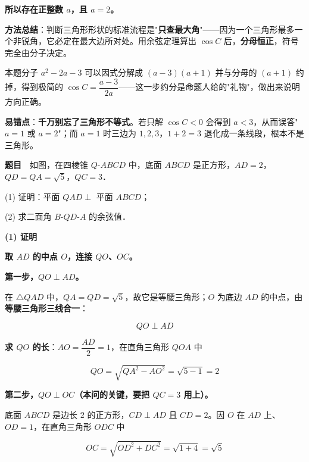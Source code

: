 \textbf{所以存在正整数 $a$，且 $a=2$。}


\begin{gktip}
\textbf{方法总结}：判断三角形形状的标准流程是"\textbf{只查最大角}"——因为一个三角形最多一个非锐角，它必定在最大边所对处。用余弦定理算出 $\cos C$ 后，\textbf{分母恒正}，符号完全由分子决定。

本题分子 $a^{2}-2a-3$ 可以因式分解成 $(a-3)(a+1)$ 并与分母的 $(a+1)$ 约掉，得到极简的 $\cos C=\dfrac{a-3}{2a}$——这一步约分是命题人给的"礼物"，做出来说明方向正确。

\textbf{易错点}：\textbf{千万别忘了三角形不等式}。若只解 $\cos C<0$ 会得到 $a<3$，从而误答"$a=1$ 或 $a=2$"；而 $a=1$ 时三边为 $1,2,3$，$1+2=3$ 退化成一条线段，根本不是三角形。
\end{gktip}

\par\medskip


\textbf{题目}　如图，在四棱锥 $Q\text{-}ABCD$ 中，底面 $ABCD$ 是正方形，$AD=2$，$QD=QA=\sqrt5$，$QC=3$．

\begin{center}\end{center}

  (1) 证明：平面 $QAD\perp$ 平面 $ABCD$；

  (2) 求二面角 $B\text{-}QD\text{-}A$ 的余弦值．

\par\medskip

\textbf{(1) 证明}

\textbf{取 $AD$ 的中点 $O$，连接 $QO$、$OC$。}

\textbf{第一步，$QO\perp AD$。}

在 $\triangle QAD$ 中，$QA=QD=\sqrt5$，故它是等腰三角形；$O$ 为底边 $AD$ 的中点，由\textbf{等腰三角形三线合一}：

\[QO\perp AD\]

\textbf{求 $QO$ 的长}：$AO=\dfrac{AD}2=1$，在直角三角形 $QOA$ 中

\[QO=\sqrt{QA^{2}-AO^{2}}=\sqrt{5-1}=2\]

\textbf{第二步，$QO\perp OC$（本问的关键，要把 $QC=3$ 用上）。}

底面 $ABCD$ 是边长 $2$ 的正方形，$CD\perp AD$ 且 $CD=2$。因 $O$ 在 $AD$ 上、$OD=1$，在直角三角形 $ODC$ 中

\[OC=\sqrt{OD^{2}+DC^{2}}=\sqrt{1+4}=\sqrt5\]

